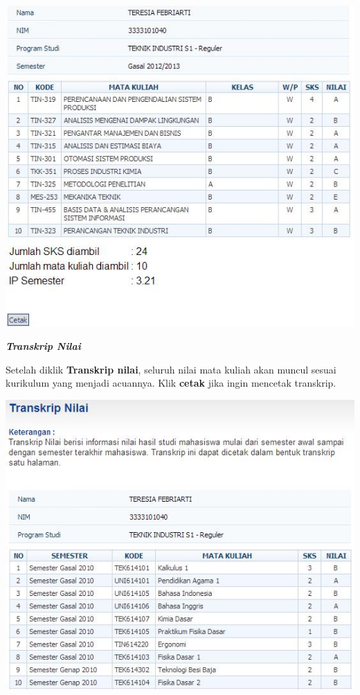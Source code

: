 \documentclass[
]{book}
\begin{document}
\begin{enumerate}
  \includegraphics[width=5.29167in,height=\textheight]{static/3.81.jpg}

  \textbf{\emph{Transkrip Nilai}}

  Setelah diklik \textbf{Transkrip nilai}, seluruh nilai mata kuliah akan muncul sesuai kurikulum yang menjadi acuannya. Klik \textbf{cetak} jika ingin mencetak transkrip.

  \includegraphics{static/3.9.jpg}


\end{enumerate}
\end{document}
